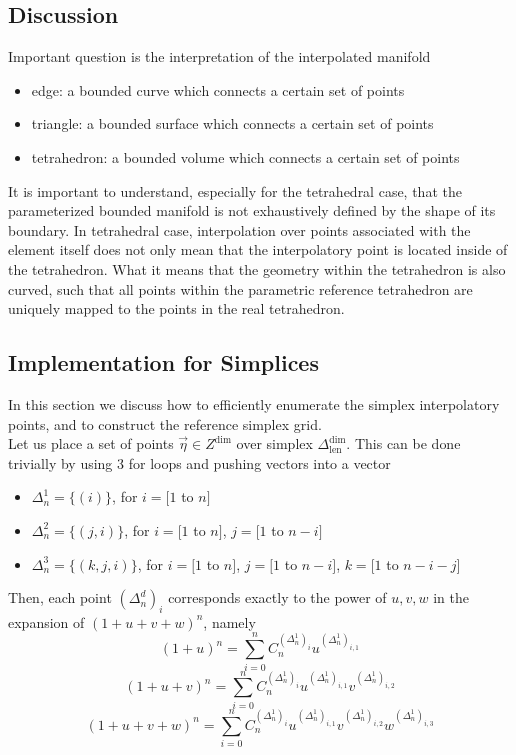 \subsection{Discussion}

\noindent
Important question is the interpretation of the interpolated manifold
\begin{itemize}
	\item edge: a bounded curve which connects a certain set of points
	\item triangle: a bounded surface which connects a certain set of points
	\item tetrahedron: a bounded volume which connects a certain set of points
\end{itemize}

\noindent
It is important to understand, especially for the tetrahedral case, that the parameterized bounded manifold is not exhaustively defined by the shape of its boundary. In tetrahedral case, interpolation over points associated with the element itself does not only mean that the interpolatory point is located inside of the tetrahedron. What it means that the geometry within the tetrahedron is also curved, such that all points within the parametric reference tetrahedron are uniquely mapped to the points in the real tetrahedron.


\subsection{Implementation for Simplices}
\label{subsection-simplexgrid}

\noindent
In this section we discuss how to efficiently enumerate the simplex interpolatory points, and to construct the reference simplex grid. \\

\noindent
Let us place a set of points $\vec{\eta} \in Z^{\dim}$ over simplex $\Delta^{\dim}_{\mathrm{len}}$. This can be done trivially
by using 3 for loops and pushing vectors into a vector
\begin{itemize}
	\item $\Delta^{1}_n = \{(i)\}$, for $i = [1$ to $n]$
	\item $\Delta^{2}_n = \{(j,i)\}$, for $i = [1$ to $n]$, $j = [1$ to $n - i]$
	\item $\Delta^{3}_n = \{(k,j,i)\}$, for $i = [1$ to $n]$, $j = [1$ to $n - i]$, $k = [1$ to $n - i - j]$
\end{itemize}

\noindent
Then, each point $(\Delta^{d}_n)_i$ corresponds exactly to the power of $u,v,w$ in the expansion of $(1 + u + v + w)^n$, namely
\[ (1 + u)^n = \sum_{i=0}^n C^{(\Delta^{1}_n)_i}_n u^{(\Delta^{1}_n)_{i,1}} \]
\[ (1 + u + v)^n = \sum_{i=0}^n C^{(\Delta^{1}_n)_i}_n u^{(\Delta^{1}_n)_{i,1}} v^{(\Delta^{1}_n)_{i,2}} \]
\[ (1 + u + v + w)^n = \sum_{i=0}^n C^{(\Delta^{1}_n)_i}_n u^{(\Delta^{1}_n)_{i,1}} v^{(\Delta^{1}_n)_{i,2}} w^{(\Delta^{1}_n)_{i,3}} \]

